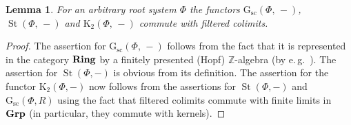\documentclass[oneside, 11pt]{amsart}
\numberwithin{equation}{section}
\newtheorem{lemma}{Lemma} \numberwithin{lemma}{section}
\newcommand{\K}{{\mathrm{K}}}
\newcommand{\St}{\mathop{\mathrm{St}}\nolimits}
\newcommand{\Gsc}{\mathrm{G}_\mathrm{sc}}
\theoremstyle{definition}
\theoremstyle{definition}
\theoremstyle{remark}
\newcommand{\ZZ}{\mathbb{Z}}
\newcommand{\catname}[1]{{\normalfont\textbf{#1}}} %
\begin{document}
\begin{lemma} \label{k2cdc} 
For an arbitrary root system $\Phi$ the functors $\Gsc(\Phi,\,-)$, $\St(\Phi,\,-)$ and $\K_2(\Phi,\,-)$ commute with filtered colimits.
\end{lemma}
\begin{proof}
The assertion for $\mathrm G_{\mathrm{sc}}(\Phi,\,-)$ follows from the fact that it is represented in the category $\catname{Ring}$ by a finitely presented (Hopf) $\ZZ$-algebra (by e.\,g.~\cite[\href{https://stacks.math.columbia.edu/tag/00QO}{Tag~00QO}]{stacks-project}). The assertion for $\St(\Phi, -)$ is obvious from its definition. The assertion for the functor $\K_2(\Phi, -)$ now follows from the assertions for $\St(\Phi, -)$ and $\Gsc(\Phi, R)$ using the fact that filtered colimits commute with finite limits in $\catname{Grp}$ (in particular, they commute with kernels).
\end{proof}
\end{document}

